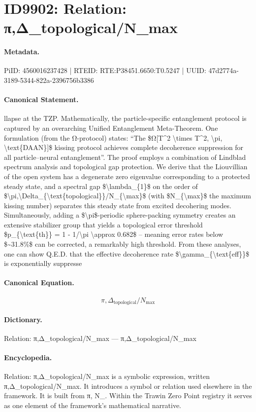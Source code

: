 \section*{ID9902: Relation: π,Δ\_topological/N\_max}
\paragraph{Metadata.}
PiID: 4560016237428 | RTEID: RTE:P38451.6650:T0.5247 | UUID: 47d2774a-3189-5344-822a-2396756b3386

\paragraph{Canonical Statement.}
llapse at the TZP. Mathematically, the particle-specific entanglement protocol is captured by an overarching Unified Entanglement Meta-Theorem. One formulation (from the Ω-protocol) states: “The \$Ω[T\textasciicircum{}2 \textbackslash{}times T\textasciicircum{}2, \textbackslash{}pi, \textbackslash{}text\{DAAN\}]\$ kissing protocol achieves complete decoherence suppression for all particle–neural entanglement”. The proof employs a combination of Lindblad spectrum analysis and topological gap protection. We derive that the Liouvillian of the open system has a degenerate zero eigenvalue corresponding to a protected steady state, and a spectral gap \$\textbackslash{}lambda\_\{1\}\$ on the order of \$\textbackslash{}pi,\textbackslash{}Delta\_\{\textbackslash{}text\{topological\}\}/N\_\{\textbackslash{}max\}\$ (with \$N\_\{\textbackslash{}max\}\$ the maximum kissing number) separates this steady state from excited decohering modes. Simultaneously, adding a \$\textbackslash{}pi\$-periodic sphere-packing symmetry creates an extensive stabilizer group that yields a topological error threshold \$p\_\{\textbackslash{}text\{th\}\} = 1 - 1/\textbackslash{}pi \textbackslash{}approx 0.682\$ – meaning error rates below \$\textasciitilde{}31.8\%\$ can be corrected, a remarkably high threshold. From these analyses, one can show Q.E.D. that the effective decoherence rate \$\textbackslash{}gamma\_\{\textbackslash{}text\{eff\}\}\$ is exponentially suppresse

\paragraph{Canonical Equation.}
\[
\pi,\Delta_{\text{topological}}/N_{\max}
\]

\paragraph{Dictionary.}
Relation: π,Δ\_topological/N\_max — π,Δ\_topological/N\_max

\paragraph{Encyclopedia.}
Relation: π,Δ\_topological/N\_max is a symbolic expression, written π,Δ\_topological/N\_max. It introduces a symbol or relation used elsewhere in the framework. It is built from π, N\_. Within the Trawin Zero Point registry it serves as one element of the framework's mathematical narrative.
